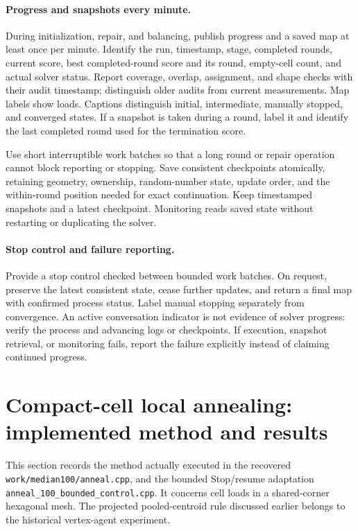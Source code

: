 \documentclass[11pt]{article}
\begin{document}
\paragraph{Progress and snapshots every minute.}
During initialization, repair, and balancing, publish progress and a
saved map at least once per minute. Identify the run, timestamp,
stage, completed rounds, current score, best completed-round score
and its round, empty-cell count, and actual solver status.
Report coverage, overlap, assignment, and shape checks with their
audit timestamp; distinguish older audits from current measurements.
Map labels show loads. Captions distinguish initial, intermediate,
manually stopped, and converged states. If a snapshot is taken during
a round, label it and identify the last completed round used for the
termination score.

Use short interruptible work batches so that a long round or repair
operation cannot block reporting or stopping. Save consistent
checkpoints atomically, retaining geometry, ownership, random-number
state, update order, and the within-round position needed for exact
continuation. Keep timestamped snapshots and a latest checkpoint.
Monitoring reads saved state without restarting or duplicating the
solver.

\paragraph{Stop control and failure reporting.}
Provide a stop control checked between bounded work batches.
On request, preserve the latest consistent state, cease further
updates, and return a final map with confirmed process status.
Label manual stopping separately from convergence.
An active conversation indicator is not evidence of solver progress:
verify the process and advancing logs or checkpoints.
If execution, snapshot retrieval, or monitoring fails, report the
failure explicitly instead of claiming continued progress.

\clearpage
\section{Compact-cell local annealing: implemented method and results}
\label{sec:compact-cell-annealing}

This section records the method actually executed in the recovered
\texttt{work/median100/anneal.cpp}, and the bounded Stop/resume adaptation
\texttt{anneal\_100\_bounded\_control.cpp}. It concerns cell loads in a
shared-corner hexagonal mesh. The projected pooled-centroid rule discussed
earlier belongs to the historical vertex-agent experiment.
\end{document}
